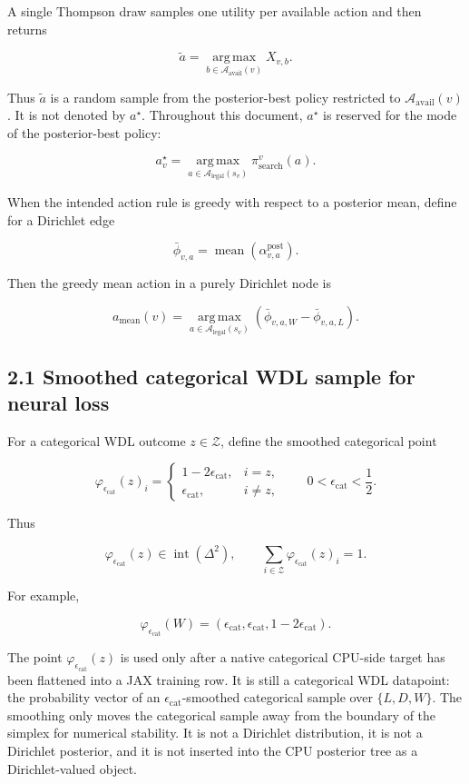 \documentclass[11pt]{article}
\newcommand{\argmax}{\operatorname*{arg\,max}}
\newcommand{\mean}{\operatorname{mean}}
\newcommand{\Legal}{\mathcal{A}_{\mathrm{legal}}}
\newcommand{\Available}{\mathcal{A}_{\mathrm{avail}}}
\newcommand{\Z}{\mathcal{Z}}
\newcommand{\epscat}{\epsilon_{\mathrm{cat}}}
\newcommand{\CatPoint}{\varphi_{\epsilon_{\mathrm{cat}}}}
\begin{document}
A single Thompson draw samples one utility per available action and then returns

\[
\tilde a
=
\argmax_{b\in\Available(v)} X_{v,b}.
\]

Thus \(\tilde a\) is a random sample from the posterior-best policy restricted
to \(\Available(v)\). It is not denoted by \(a^\star\). Throughout this document,
\(a^\star\) is reserved for the mode of the posterior-best policy:

\[
a^\star_v
=
\argmax_{a\in\Legal(s_v)}
\pi_{\mathrm{search}}^v(a).
\]

When the intended action rule is greedy with respect to a posterior mean, define
for a Dirichlet edge

\[
\bar\phi_{v,a}
=
\mean
\left(
\alpha^{\mathrm{post}}_{v,a}
\right).
\]

Then the greedy mean action in a purely Dirichlet node is

\[
a_{\mathrm{mean}}(v)
=
\argmax_{a\in\Legal(s_v)}
\left(
\bar\phi_{v,a,W}-\bar\phi_{v,a,L}
\right).
\]

\subsection*{2.1 Smoothed categorical WDL sample for neural loss}

For a categorical WDL outcome \(z\in\Z\), define the smoothed categorical point

\[
\CatPoint(z)_i=
\begin{cases}
1-2\epscat, & i=z,\\
\epscat, & i\ne z,
\end{cases}
\qquad
0<\epscat<\frac12.
\]

Thus

\[
\CatPoint(z)\in\operatorname{int}(\Delta^2),
\qquad
\sum_{i\in\Z}\CatPoint(z)_i=1.
\]

For example,

\[
\CatPoint(W)=(\epscat,\epscat,1-2\epscat).
\]

The point \(\CatPoint(z)\) is used only after a native categorical CPU-side
target has been flattened into a JAX training row. It is still a categorical WDL
datapoint: the probability vector of an \(\epscat\)-smoothed categorical sample
over \(\{L,D,W\}\). The smoothing only moves the categorical sample away from
the boundary of the simplex for numerical stability. It is not a Dirichlet
distribution, it is not a Dirichlet posterior, and it is not inserted into the
CPU posterior tree as a Dirichlet-valued object.
\end{document}
